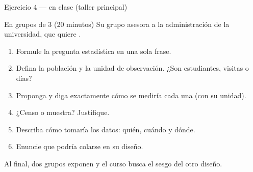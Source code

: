 \documentclass[aspectratio=169,10pt]{beamer}
\begin{document}
\begin{frame}{Ejercicio 4 — en clase (taller principal)}
  \begin{alertblock}{En grupos de 3 (20 minutos)}
    \scriptsize
    Su grupo asesora a la administración de la universidad, que quiere
    .

    \vspace{0.2cm}
    \begin{enumerate}\setlength{\itemsep}{-0.06cm}
      \item Formule la pregunta estadística en una sola frase.
      \item Defina la población y la unidad de observación. ¿Son estudiantes,
            visitas o días?
      \item Proponga  y diga exactamente cómo se
            mediría cada una (con su unidad).
      \item ¿Censo o muestra? Justifique.
      \item Describa cómo tomaría los datos: quién, cuándo y dónde.
      \item Enuncie  que podría colarse en su diseño.
    \end{enumerate}

    \vspace{0.1cm}
    Al final, dos grupos exponen y el curso busca el sesgo del otro diseño.
  \end{alertblock}
\end{frame}
\end{document}
